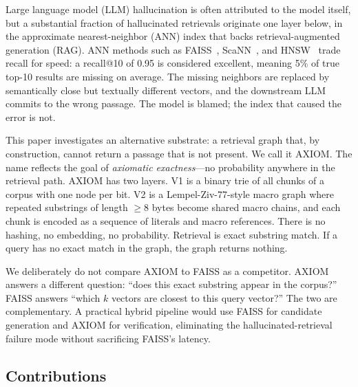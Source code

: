 \documentclass[conference]{IEEEtran}
\begin{document}
Large language model (LLM) hallucination is often attributed to the model itself, but a substantial fraction of hallucinated retrievals originate one layer below, in the approximate nearest-neighbor (ANN) index that backs retrieval-augmented generation (RAG). ANN methods such as FAISS~\cite{johnson2019faiss}, ScaNN~\cite{guo2020scann}, and HNSW~\cite{malkov2018hnsw} trade recall for speed: a recall@10 of 0.95 is considered excellent, meaning 5\% of true top-10 results are missing on average. The missing neighbors are replaced by semantically close but textually different vectors, and the downstream LLM commits to the wrong passage. The model is blamed; the index that caused the error is not.

This paper investigates an alternative substrate: a retrieval graph that, by construction, cannot return a passage that is not present. We call it AXIOM. The name reflects the goal of \emph{axiomatic exactness}---no probability anywhere in the retrieval path. AXIOM has two layers. V1 is a binary trie of all chunks of a corpus with one node per bit. V2 is a Lempel-Ziv-77-style macro graph where repeated substrings of length $\geq 8$ bytes become shared macro chains, and each chunk is encoded as a sequence of literals and macro references. There is no hashing, no embedding, no probability. Retrieval is exact substring match. If a query has no exact match in the graph, the graph returns nothing.

We deliberately do not compare AXIOM to FAISS as a competitor. AXIOM answers a different question: ``does this exact substring appear in the corpus?'' FAISS answers ``which $k$ vectors are closest to this query vector?'' The two are complementary. A practical hybrid pipeline would use FAISS for candidate generation and AXIOM for verification, eliminating the hallucinated-retrieval failure mode without sacrificing FAISS's latency.

\subsection{Contributions}
\end{document}
